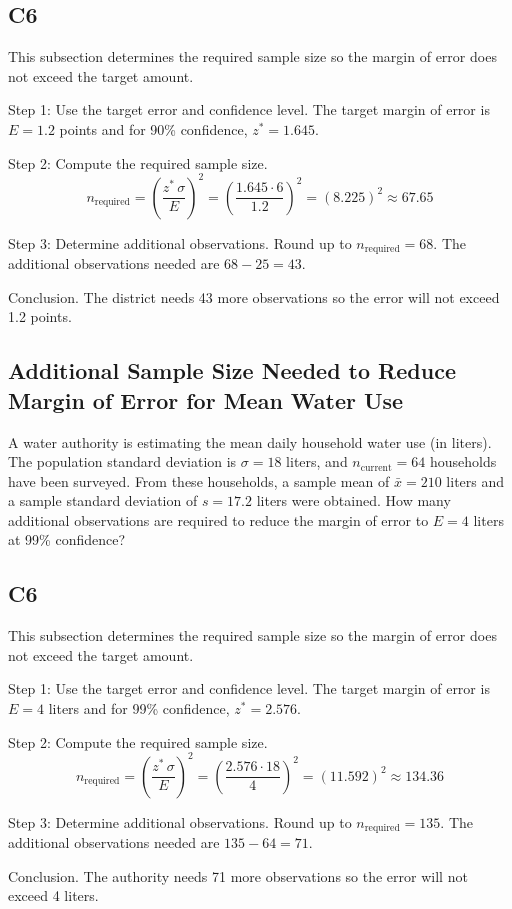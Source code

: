 \begin{ExamProblems}
		\subsection*{C6}
		This subsection determines the required sample size so the margin of error does not exceed the target amount.
		
		Step 1: Use the target error and confidence level. The target margin of error is $E = 1.2$ points and for 90\% confidence, $z^* = 1.645$.
		
		Step 2: Compute the required sample size.
		\[
		n_{\text{required}} = \left(\frac{z^*\,\sigma}{E}\right)^2
		= \left(\frac{1.645 \cdot 6}{1.2}\right)^2
		= \left(8.225\right)^2
		\approx 67.65
		\]
		
		Step 3: Determine additional observations. Round up to $n_{\text{required}} = 68$. The additional observations needed are $68 - 25 = 43$.
		
		Conclusion. The district needs 43 more observations so the error will not exceed 1.2 points.
		
		\item
		\subsection*{Additional Sample Size Needed to Reduce Margin of Error for Mean Water Use}
		A water authority is estimating the mean daily household water use (in liters). The population standard deviation is $\sigma = 18$ liters, and $n_{\text{current}} = 64$ households have been surveyed. From these households, a sample mean of $\bar{x} = 210$ liters and a sample standard deviation of $s = 17.2$ liters were obtained. How many additional observations are required to reduce the margin of error to $E = 4$ liters at 99\% confidence?
		
		\subsection*{C6}
		This subsection determines the required sample size so the margin of error does not exceed the target amount.
		
		Step 1: Use the target error and confidence level. The target margin of error is $E = 4$ liters and for 99\% confidence, $z^* = 2.576$.
		
		Step 2: Compute the required sample size.
		\[
		n_{\text{required}} = \left(\frac{z^*\,\sigma}{E}\right)^2
		= \left(\frac{2.576 \cdot 18}{4}\right)^2
		= \left(11.592\right)^2
		\approx 134.36
		\]
		
		Step 3: Determine additional observations. Round up to $n_{\text{required}} = 135$. The additional observations needed are $135 - 64 = 71$.
		
		Conclusion. The authority needs 71 more observations so the error will not exceed 4 liters.
		
	\end{ExamProblems}

